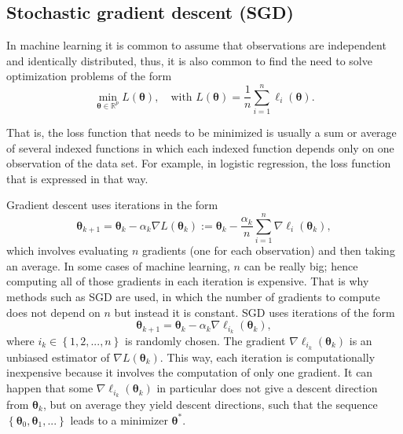 \subsection{Stochastic gradient descent (SGD)}

In machine learning it is common to assume that observations are independent and identically distributed, thus, it is also common to find the need to solve optimization problems of the form
\begin{equation}
  \min_{\boldsymbol{\theta} \in \mathbb{R}^p} L(\boldsymbol{\theta}), \quad \text{with} \, \,
  L(\boldsymbol{\theta}) = \frac{1}{n} \sum_{i = 1}^n { \ell_i(\boldsymbol{\theta}) }.
\end{equation}

That is, the loss function that needs to be minimized is usually a sum or average of several indexed functions in which each indexed function depends only on one observation of the data set. For example, in logistic regression, the loss function that is expressed in that way.

Gradient descent uses iterations in the form
\begin{equation}
  \boldsymbol{\theta}_{k+1} = \boldsymbol{\theta}_k - \alpha_k \nabla L(\boldsymbol{\theta}_k) :=\boldsymbol{\theta}_k - \frac{\alpha_k}{n} \sum_{i = 1}^n \nabla \ell_i(\boldsymbol{\theta}_k),
\end{equation}
which involves evaluating $n$ gradients (one for each observation) and then taking an average. In some cases of machine learning, $n$ can be really big; hence computing all of those gradients in each iteration is expensive. That is why methods such as SGD are used, in which the number of gradients to compute does not depend on $n$ but instead it is constant. SGD uses iterations of the form
\begin{equation}
  \boldsymbol{\theta}_{k+1} = \boldsymbol{\theta}_k - \alpha_k \nabla \ell_{i_k}(\boldsymbol{\theta}_k),
\end{equation}
where $i_k \in \left\{1, 2, ..., n \right\}$ is randomly chosen. The gradient $\nabla \ell_{i_k}(\boldsymbol{\theta}_k)$ is an unbiased estimator of $\nabla L(\boldsymbol{\theta}_k)$. This way, each iteration is computationally inexpensive because it involves the computation of only one gradient. It can happen that some $\nabla \ell_{i_k}(\boldsymbol{\theta}_k)$ in particular does not give a descent direction from $\boldsymbol{\theta}_k$, but on average they yield descent directions, such that the sequence $\left\{ \boldsymbol{\theta}_0, \boldsymbol{\theta}_1, ... \right\}$ leads to a minimizer $\boldsymbol{\theta}^*$.

